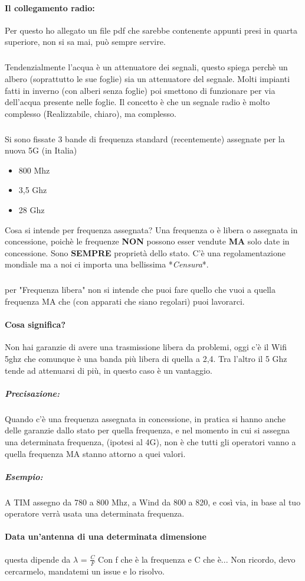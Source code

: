 \documentclass[12pt, a4paper, openany, twoside]{book}
\begin{document}
\paragraph{Il collegamento radio: }Per questo ho allegato un file pdf che 
sarebbe contenente appunti presi in quarta superiore, non si sa mai, può
sempre servire. 
\subparagraph{}Tendenzialmente l'acqua è un attenuatore dei segnali, questo
spiega perchè un albero (soprattutto le sue foglie) sia un attenuatore del 
segnale. Molti impianti fatti in inverno (con alberi senza foglie) poi 
smettono di funzionare per via dell'acqua presente nelle foglie. Il concetto
è che un segnale radio è molto complesso (Realizzabile, chiaro), ma complesso.
\subparagraph{}Si sono fissate 3 bande di frequenza standard (recentemente) 
assegnate per la nuova 5G (in Italia)
\begin{itemize}
	\item 800 Mhz
	\item 3,5 Ghz
	\item 28 Ghz
\end{itemize}	
Cosa si intende per frequenza assegnata? Una frequenza o è libera o assegnata in
concessione, poichè le frequenze \textbf{NON} possono esser vendute \textbf{MA}
solo date in concessione. Sono \textbf{SEMPRE} proprietà dello stato. C'è una
regolamentazione mondiale ma a noi ci importa una bellissima *\textit{Censura}*.
\subparagraph{}per "Frequenza libera" non si intende che puoi fare quello che 
vuoi a quella frequenza MA che (con apparati che siano regolari) puoi lavorarci.
\paragraph{Cosa significa?} Non hai garanzie di avere una trasmissione libera da
problemi, oggi c'è il Wifi 5ghz che comunque è una banda più libera di quella a 
2,4. Tra l'altro il 5 Ghz tende ad attenuarsi di più, in questo caso è un 
vantaggio. 
\subparagraph{Precisazione: }Quando c'è una frequenza assegnata in concessione,
in pratica si hanno anche delle garanzie dallo stato per quella frequenza, e
nel momento in cui si assegna una determinata frequenza, (ipotesi al 4G), 
non è che tutti gli operatori vanno a quella frequenza MA stanno attorno a quei
valori. 
\subparagraph{Esempio:} A TIM assegno da 780 a 800 Mhz, a Wind da 800 a 820, 
e così via, in base al tuo operatore verrà usata una determinata frequenza.
\paragraph{Data un'antenna di una determinata dimensione} questa dipende da
$\lambda$ = $\frac{C}{F}$ Con f che è la frequenza e C che è... Non ricordo, 
devo cercarmelo, mandatemi un issue e lo risolvo.
\end{document}
